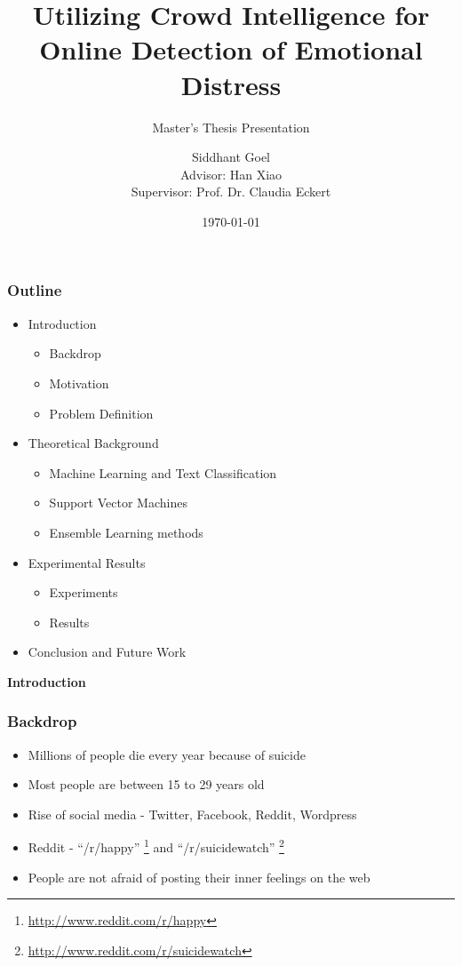 \documentclass[9pt]{beamer}
\title{Utilizing Crowd Intelligence for Online Detection of Emotional Distress}
\subtitle{Master's Thesis Presentation}
\author[Siddhant Goel]{Siddhant Goel\\{\small Advisor: Han Xiao\\Supervisor: Prof. Dr. Claudia Eckert}}
\institute{
Chair for IT Security\\
Technische Universit\"at M\"unchen
}
\date{\today}
\begin{document}
    \begin{frame}[plain]
        \titlepage
    \end{frame}
    
    \begin{frame}
        \frametitle{Outline}
        \begin{itemize}
            \item{
            Introduction
            \begin{itemize}
                \item{Backdrop}
                \item{Motivation}
                \item{Problem Definition}
            \end{itemize}
            }
            \item{
            Theoretical Background
            \begin{itemize}
                \item{Machine Learning and Text Classification}
                \item{Support Vector Machines}
                \item{Ensemble Learning methods}
            \end{itemize}
            }
            \item{
            Experimental Results
            \begin{itemize}
                \item{Experiments}
                \item{Results}
            \end{itemize}
            }
            \item{Conclusion and Future Work}
        \end{itemize}
    \end{frame}
    
    \begin{frame}
        \begin{center}
            \textbf{Introduction}
        \end{center}
    \end{frame}
    
    \begin{frame}
        \frametitle{Backdrop}
        \begin{itemize}
            \item{Millions of people die every year because of suicide}
            \item{Most people are between 15 to 29 years old}
            \item{Rise of social media - Twitter, Facebook, Reddit, Wordpress}
            \item{Reddit - ``/r/happy'' \footnote{\url{http://www.reddit.com/r/happy}} and ``/r/suicidewatch'' \footnote{\url{http://www.reddit.com/r/suicidewatch}}}
            \item{People are not afraid of posting their inner feelings on the web}
        \end{itemize}
    \end{frame}
    
\end{document}
